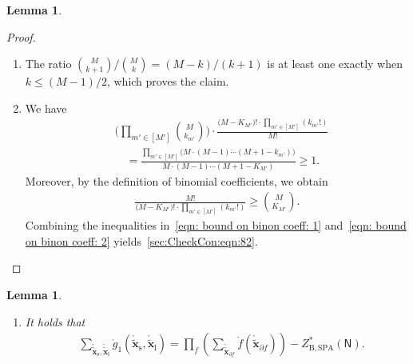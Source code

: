 \documentclass[journal]{IEEEtran}
\newcommand{\add}[1]{{\color{black}#1}}
\newtheorem{lemma}[theorem]{Lemma}
\newcommand{\vect}[1]{ \bm{#1} }
\newcommand{\setpf}{ \partial f }
\newcommand{\graphN}{ \mathsf{N} }
\newcommand{\ZBSPA}{ Z_{\mathrm{B,SPA}} }
\newcommand{\LCTtv}[1]{ \mathring{ \tilde{ \vect{#1} } } }
\newcommand{\LCT}[1]{ \mathring{#1} }
\newcommand{\LCTvxl}{ \LCTtv{x}_{\mathrm{l}} }
\newcommand{\LCTvxs}{ \LCTtv{x}_{\mathrm{s}} }
\newcommand{\gone}{\LCT{g}_{1}}
\begin{document}
\begin{appendices}
\begin{lemma}
  \end{lemma}
  \begin{proof}
    \noindent
    \begin{enumerate}
      \item \add{The ratio $\binom{M}{k+1}/\binom{M}{k}=(M-k)/(k+1)$ is at least
              one exactly when $k\leq(M-1)/2$, which proves the claim.}

      \item \add{ We have}
            \begin{align}
               & \Biggl( \prod\limits_{m' \in [M']}\binom{M}{ k_{m'} } \Biggr)
              \cdot
              \frac{
                \biggl( M-K_{M'} \biggr)!
                \cdot \prod\limits_{m' \in [M']}(k_{m'}!)
              }{
                M!
              }
              \nonumber                                                        \\
               & \quad = \frac{
                           \prod\limits_{m' \in [M']}
                           \bigl( M \cdot ( M - 1 ) \cdots
                           (M +1 -k_{m'}) \bigr)
                         }{
                           M \cdot ( M - 1 ) \cdots
                           \left( M +1 - K_{M'} \right)
                         } \geq 1. \label{eqn: bound on binon coeff: 1}
            \end{align}
            Moreover, by the definition of binomial coefficients, we obtain
            \begin{align}
              \frac{
                M!
              }{
                \biggl( M-K_{M'} \biggr)!
                \cdot \prod\limits_{m' \in [M']}(k_{m'}!)
              }\geq \binom{M}{K_{M'}}. \label{eqn: bound on binon coeff: 2}
            \end{align}
            Combining the inequalities in~\eqref{eqn: bound on binon coeff: 1}
            \add{and~\eqref{eqn: bound on binon coeff: 2} yields~\eqref{sec:CheckCon:eqn:82}.}\qedhere
    \end{enumerate}

  \end{proof}

  \begin{lemma}\label{sec:CheckCon:prop:properties of N(0)}
    \noindent
    \begin{enumerate}

      \item \add{It holds that}
            \begin{align*}
               & \sum_{ \LCTvxs, \LCTvxl }
              \gone( \LCTvxs, \LCTvxl )
              = \prod_{f}
              \left(
              \sum_{\LCTtv{x}_{\setpf}}
              \LCT{f}( \LCTtv{x}_{\setpf} )
              \right)
              -
              \ZBSPA^{*}(\graphN).
            \end{align*}


\end{enumerate}
\end{lemma}
\end{appendices}
\end{document}
